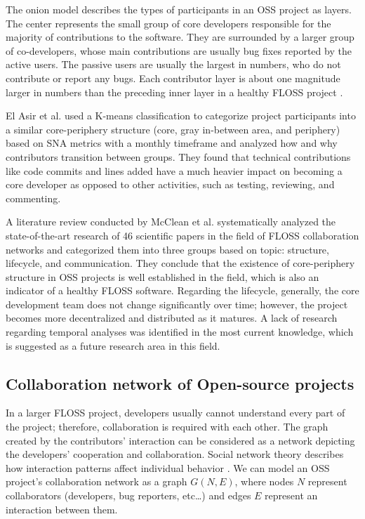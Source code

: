 The onion model describes the types of participants in an OSS project as layers. The center represents the small group of core developers responsible for the majority of contributions to the software. They are surrounded by a larger group of co-developers, whose main contributions are usually bug fixes reported by the active users. The passive users are usually the largest in numbers, who do not contribute or report any bugs. Each contributor layer is about one magnitude larger in numbers than the preceding inner layer in a healthy FLOSS project \cite{mockusTwoCaseStudies2002}.

El Asir et al. \cite{elasriPeripheryCoreTemporal2017} used a K-means classification to categorize project participants into a similar core-periphery structure (core, gray in-between area, and periphery) based on SNA metrics with a monthly timeframe and analyzed how and why contributors transition between groups. They found that technical contributions like code commits and lines added have a much heavier impact on becoming a core developer as opposed to other activities, such as testing, reviewing, and commenting.

A literature review conducted by McClean et al. \cite{mccleanSocialNetworkAnalysis2021} systematically analyzed the state-of-the-art research of 46 scientific papers in the field of FLOSS collaboration networks and categorized them into three groups based on topic: structure, lifecycle, and communication. They conclude that the existence of core-periphery structure in OSS projects is well established in the field, which is also an indicator of a healthy FLOSS software. Regarding the lifecycle, generally, the core development team does not change significantly over time; however, the project becomes more decentralized and distributed as it matures. A lack of research regarding temporal analyses was identified in the most current knowledge, which is suggested as a future research area in this field.

\subsection{Collaboration network of Open-source projects}
In a larger FLOSS project, developers usually cannot understand every part of the project; therefore, collaboration is required with each other. The graph created by the contributors' interaction can be considered as a network depicting the developers' cooperation and collaboration. Social network theory describes how interaction patterns affect individual behavior \cite{martinez-torresGeneticSearchPatterns2012}. We can model an OSS project's collaboration network as a graph $G(N, E)$, where nodes $N$ represent collaborators (developers, bug reporters, etc\dots) and edges $E$ represent an interaction between them. 

